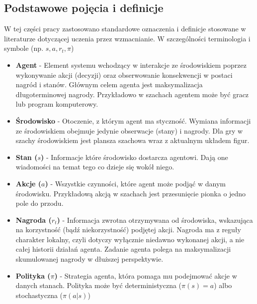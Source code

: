 \documentclass[a4paper, 12pt]{article}
\begin{document}
    \subsection{Podstawowe pojęcia i definicje}
    W tej części pracy zastosowano standardowe oznaczenia i definicje stosowane w literaturze dotyczącej uczenia przez wzmacnianie. 
    W szczególności terminologia i symbole (np. \( s, a, r_t, \pi \)) \cite{lapan2020deep}
    \begin{itemize}
        \item \textbf{Agent} - Element systemu wchodzący w interakcje ze środowiskiem poprzez wykonywanie akcji (decyzji) oraz obserwowanie konsekwencji w postaci nagród i stanów.
        Głównym celem agenta jest maksymalizacja długoterminowej nagrody. 
        Przykładowo w szachach agentem może być gracz lub program komputerowy.
        \item \textbf{Środowisko} - Otoczenie, z którym agent ma styczność. 
        Wymiana informacji ze środowiskiem obejmuje jedynie obserwacje (stany) i nagrody.
        Dla gry w szachy środowiskiem jest plansza szachowa wraz z aktualnym układem figur.
        \item \textbf{Stan (\( s \))} - Informacje które środowisko dostarcza agentowi. Dają one wiadomości na temat tego co dzieje się wokół niego.
        \item \textbf{Akcje (\( a \))} - Wszystkie czynności, które agent może podjąć w danym środowisku. 
        Przykładową akcją w szachach jest przesunięcie pionka o jedno pole do przodu.
        \item \textbf{Nagroda (\( r_t \))} - Informacja zwrotna otrzymywana od środowiska, wskazująca na korzystność (bądź niekorzystność) podjętej akcji. 
        Nagroda ma z reguły charakter lokalny, czyli dotyczy wyłącznie niedawno wykonanej akcji, a nie całej historii działań agenta. 
        Zadanie agenta polega na maksymalizacji skumulowanej nagrody w dłuższej perspektywie.
        \item \textbf{Polityka (\( \pi \))} - Strategia agenta, która pomaga mu podejmować akcje w danych stanach. Polityka może być deterministyczna
        (\( \pi(s) = a \)) albo stochastyczna (\( \pi(a|s) \))
    \end{itemize}
\end{document}
